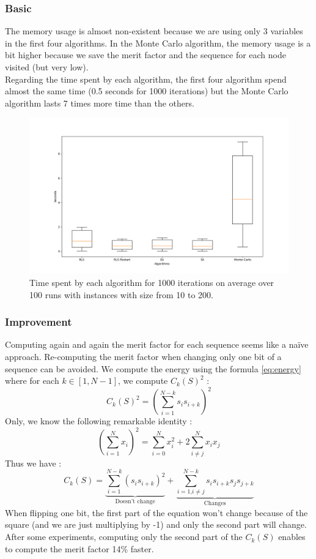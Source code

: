 \documentclass[a4paper,11pt,openany]{article}
\begin{document}
\subsubsection{Basic}
\noindent
The memory usage is almost non-existent because we are using only 3 variables in the first four algorithms. In the Monte Carlo algorithm, the memory usage is a bit higher because we save the merit factor and the sequence for each node visited (but very low).\\
Regarding the time spent by each algorithm, the first four algorithm spend almost the same time (0.5 seconds for 1000 iterations) but the Monte Carlo algorithm lasts 7 times more time than the others.
\begin{figure}[H]
\begin{center}
\includegraphics[scale=0.26]{Images/time_spent}
\caption{Time spent by each algorithm for 1000 iterations on average over 100 runs with instances with size from 10 to 200.}
\label{fig:time_spent}
\end{center}
\end{figure}
\subsubsection{Improvement}
\noindent
Computing again and again the merit factor for each sequence seems like a naïve approach. Re-computing the merit factor when changing only one bit of a sequence can be avoided. We compute the energy using the formula \ref{eq:energy} where for each $k \in [1,N-1]$, we compute $C_k(S)^2$ :
\begin{equation}
C_k(S)^2=(\sum_{i=1}^{N-k}s_is_{i+k})^2
\end{equation}
Only, we know the following remarkable identity :
\begin{equation}
(\sum_{i=1}^{N}x_i)^2 = \sum_{i=0}^Nx_i^2+2\sum_{i\neq j}^Nx_i x_j
\end{equation}
Thus we have :
\begin{equation}
C_k(S)=\underbrace{\sum_{i=1}^{N-k}(s_is_{i+k})^2}_\text{Doesn't change}+\underbrace{\sum_{i=1\text{,} i\neq j}^{N-k}s_is_{i+k}s_js_{j+k}}_\text{Changes}
\end{equation}
When flipping one bit, the first part of the equation won't change because of the square (and we are just multiplying by -1) and only the second part will change. After some experiments, computing only the second part of the $C_k(S)$ enables to compute the merit factor 14\% faster.
\end{document}
